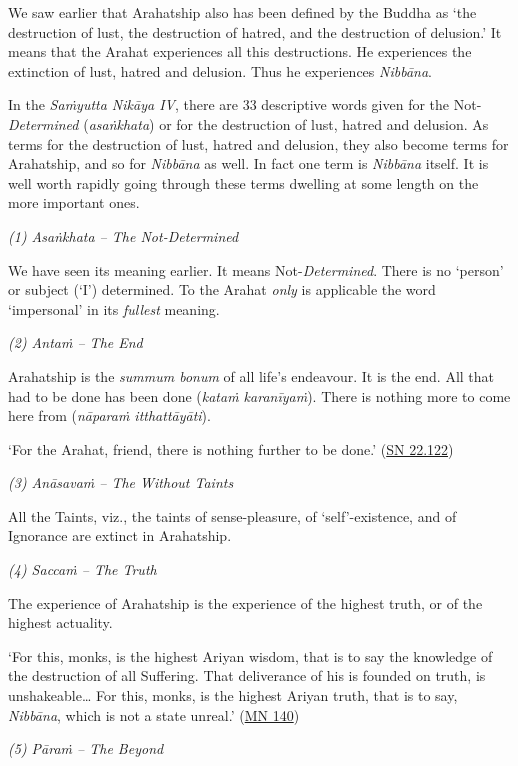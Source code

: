 We saw earlier that Arahatship also has been defined by the Buddha as `the destruction of lust, the destruction of hatred, and the destruction of delusion.' It means that the Arahat experiences all this destructions. He experiences the extinction of lust, hatred and delusion. Thus he experiences \textit{Nibbāna}.

In the \textit{Saṁyutta Nikāya IV}, there are 33 descriptive words given for the Not-\textit{Determined} (\textit{asaṅkhata}) or for the destruction of lust, hatred and delusion. As terms for the destruction of lust, hatred and delusion, they also become terms for Arahatship, and so for \textit{Nibbāna} as well. In fact one term is \textit{Nibbāna} itself. It is well worth rapidly going through these terms dwelling at some length on the more important ones.

\emph{(1) Asaṅkhata -- The \textit{Not}-Determined}

We have seen its meaning earlier. It means Not-\textit{Determined}. There is no `person' or subject (`I') determined. To the Arahat \emph{only} is applicable the word `impersonal' in its \emph{fullest} meaning.

\emph{(2) Antaṁ -- The End}

Arahatship is the \emph{summum bonum} of all life's endeavour. It is the end. All that had to be done has been done (\textit{kataṁ karanīyaṁ}). There is nothing more to come here from (\textit{nāparaṁ itthattāyāti}).

`For the Arahat, friend, there is nothing further to be done.' (\href{https://suttacentral.net/sn22.122/en/suddhaso}{SN 22.122})

\emph{(3) Anāsavaṁ -- The Without Taints}

All the Taints, viz., the taints of sense-pleasure, of `self'-existence, and of Ignorance are extinct in Arahatship.

\emph{(4) Saccaṁ -- The Truth}

The experience of Arahatship is the experience of the highest truth, or of the highest actuality.

`For this, monks, is the highest Ariyan wisdom, that is to say the knowledge of the destruction of all Suffering. That deliverance of his is founded on truth, is unshakeable\ldots\hspace{0pt} For this, monks, is the highest Ariyan truth, that is to say, \textit{Nibbāna}, which is not a state unreal.' (\href{https://suttacentral.net/mn140/en/bodhi}{MN 140})

\emph{(5) Pāraṁ -- The Beyond}

